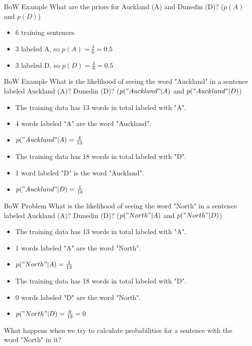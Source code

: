 \documentclass[aspectratio=169, 10pt]{beamer}
\begin{document}
\begin{frame}{BoW Example}
    What are the priors for Auckland (A) and Dunedin (D)? ($p(A)$ and $p(D)$)
    \pause
    \begin{itemize}
        \item 6 training sentences.
        \item 3 labeled A, so $p(A) = \frac{3}{6} = 0.5$
        \item 3 labeled D, so $p(D) = \frac{3}{6} = 0.5$
    \end{itemize}
\end{frame}

\begin{frame}{BoW Example}
 What is the likelihood of seeing the word "Auckland" in a sentence labeled Auckland (A)? Dunedin (D)? ($p("Auckland"|A)$ and $p("Auckland"|D)$)
 \pause
 \begin{itemize}
     \item The training data has 13 words in total labeled with "A".
     \item 4 words labeled "A" are the word "Auckland".
     \item $p("Auckland"|A) = \frac{4}{13}$
     \pause
     \item The training data has 18 words in total labeled with "D".
     \item 1 word labeled "D" is the word "Auckland".
     \item $p("Auckland"|D) = \frac{1}{18}$
 \end{itemize}
\end{frame}

\begin{frame}{BoW Problem}
 What is the likelihood of seeing the word "North" in a sentence labeled Auckland (A)? Dunedin (D)? ($p("North"|A)$ and $p("North"|D)$)
 \pause
 \begin{itemize}
     \item The training data has 13 words in total labeled with "A".
     \item 1 words labeled "A" are the word "North".
     \item $p("North"|A) = \frac{1}{13}$
     \item The training data has 18 words in total labeled with "D".
     \item 0 words labeled "D" are the word "North".
     \item $p("North"|D) = \frac{0}{18} = 0$
 \end{itemize}
 What happens when we try to calculate probabilities for a sentence with the word "North" in it?
\end{frame}
\end{document}
